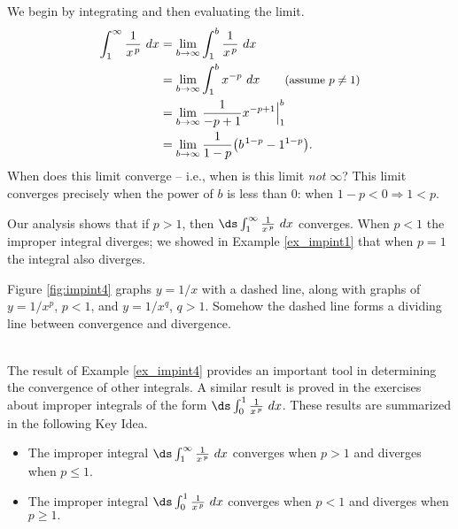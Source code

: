 {We begin by integrating and then evaluating the limit.
\begin{align*}
\int_1^\infty \frac1{x\hskip1pt ^p}\ dx &=	\lim_{b\to\infty}\int_1^b\frac1{x\hskip1pt ^p}\ dx\\
		&=	\lim_{b\to\infty}\int_1^b x^{-p}\ dx \qquad \text{\small (assume $p\neq 1$)}\\
		&= \lim_{b\to\infty} \frac{1}{-p+1}x^{-p+1}\Big|_1^b\\
		&= \lim_{b\to\infty} \frac{1}{1-p}\big(b\hskip1pt^{1-p}-1^{1-p}\big).\\
\end{align*}
When does this limit converge -- i.e., when is this limit \textit{not} $\infty$? This limit converges precisely when the power of $b$ is less than 0: when $1-p<0 \Rightarrow 1<p$. 


Our analysis shows that if $p>1$, then $\ds\int_1^\infty \frac1{x\hskip1pt ^p}\ dx $ converges. When $p<1$ the improper integral diverges; we showed in Example \ref{ex_impint1} that when $p=1$ the integral also diverges. 

Figure \ref{fig:impint4} graphs $y=1/x$ with a dashed line, along with graphs of $y=1/x^p$, $p<1$, and $y=1/x^q$, $q>1$. Somehow the dashed line forms a dividing line between convergence and divergence. %
}\\

The result of Example \ref{ex_impint4} provides an important tool in determining the convergence of other integrals. A similar result is proved in the exercises about improper integrals of the form $\ds \int_0^1\frac1{x\hskip1pt ^p}\ dx$. These results are summarized in the following Key Idea.


\setboxwidth{80pt}%
{\begin{itemize}
\item		The improper integral $\ds \int_1^\infty\frac1{x\hskip1pt ^p}\ dx$ converges when $p>1$ and diverges when $p\leq 1.$
\item		The improper integral $\ds \int_0^1\frac1{x\hskip1pt ^p}\ dx$ converges when $p<1$ and diverges when $p\geq 1.$
\end{itemize}
}
\restoreboxwidth


